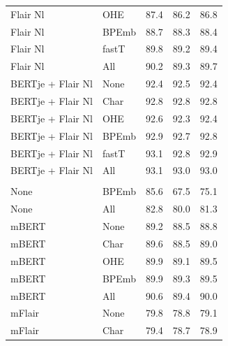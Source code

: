 \documentclass[12pt,a4paper,]{book}
\begin{document}
\begin{longtable}[t]{llrrr}
\hspace{1em}Flair Nl & OHE & 87.4 & 86.2 & 86.8\\
\hspace{1em}Flair Nl & BPEmb & 88.7 & 88.3 & 88.4\\
\hspace{1em}Flair Nl & fastT & 89.8 & 89.2 & 89.4\\
\hspace{1em}Flair Nl & All & 90.2 & 89.3 & 89.7\\
\hspace{1em}BERTje + Flair Nl & None & 92.4 & 92.5 & 92.4\\
\hspace{1em}BERTje + Flair Nl & Char & 92.8 & 92.8 & 92.8\\
\hspace{1em}BERTje + Flair Nl & OHE & 92.6 & 92.3 & 92.4\\
\hspace{1em}BERTje + Flair Nl & BPEmb & 92.9 & 92.7 & 92.8\\
\hspace{1em}BERTje + Flair Nl & fastT & 93.1 & 92.8 & 92.9\\
\hspace{1em}BERTje + Flair Nl & All & 93.1 & 93.0 & 93.0\\
\addlinespace[0.3em]
\multicolumn{5}{l}{\textbf{Multilingual embeddings}}\\
\hspace{1em}None & BPEmb & 85.6 & 67.5 & 75.1\\
\hspace{1em}None & All & 82.8 & 80.0 & 81.3\\
\hspace{1em}mBERT & None & 89.2 & 88.5 & 88.8\\
\hspace{1em}mBERT & Char & 89.6 & 88.5 & 89.0\\
\hspace{1em}mBERT & OHE & 89.9 & 89.1 & 89.5\\
\hspace{1em}mBERT & BPEmb & 89.9 & 89.3 & 89.5\\
\hspace{1em}mBERT & All & 90.6 & 89.4 & 90.0\\
\hspace{1em}mFlair & None & 79.8 & 78.8 & 79.1\\
\hspace{1em}mFlair & Char & 79.4 & 78.7 & 78.9\\

\end{longtable}
\end{document}
